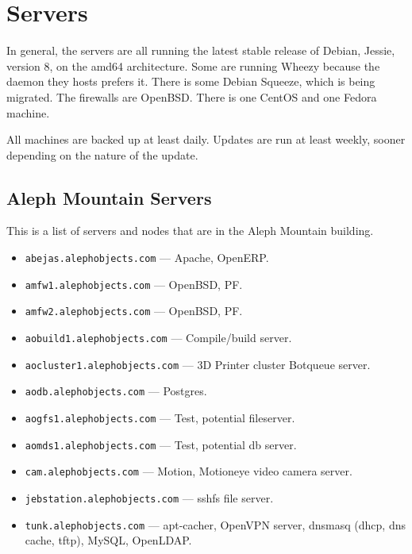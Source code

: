 %
%
%
%
%

\section{Servers}
In general, the servers are all running the latest stable release of Debian,
Jessie, version 8, on the amd64 architecture. Some are running Wheezy because
the daemon they hosts prefers it. There is some Debian Squeeze, which is being
migrated. The firewalls are OpenBSD. There is one CentOS and one Fedora
machine.

All machines are backed up at least daily. Updates are run at least weekly,
sooner depending on the nature of the update.

\subsection{Aleph Mountain Servers}
This is a list of servers and nodes that are in the Aleph Mountain building.

\begin{itemize}
\item \texttt{abejas.alephobjects.com} --- Apache, OpenERP.
\item \texttt{amfw1.alephobjects.com} --- OpenBSD, PF.
\item \texttt{amfw2.alephobjects.com} --- OpenBSD, PF.
\item \texttt{aobuild1.alephobjects.com} --- Compile/build server.
\item \texttt{aocluster1.alephobjects.com} --- 3D Printer cluster Botqueue
       server.
\item \texttt{aodb.alephobjects.com} --- Postgres.
\item \texttt{aogfs1.alephobjects.com} --- Test, potential fileserver.
\item \texttt{aomds1.alephobjects.com} --- Test, potential db server.
\item \texttt{cam.alephobjects.com} --- Motion, Motioneye video camera server.
\item \texttt{jebstation.alephobjects.com} --- sshfs file server.
\item \texttt{tunk.alephobjects.com} --- apt-cacher, OpenVPN server, dnsmasq
      (dhcp, dns cache, tftp), MySQL, OpenLDAP.
\end{itemize}

